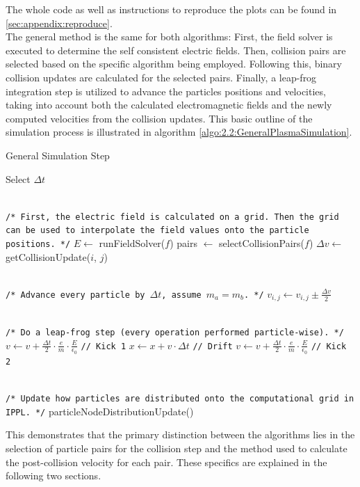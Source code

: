 The whole code as well as instructions to reproduce the plots can be found in \ref{sec:appendix:reproduce}. \\
The general method is the same for both algorithms: First, the field solver is executed to determine the self consistent electric fields. Then, collision pairs are selected based on the specific algorithm being employed. Following this, binary collision updates are calculated for the selected pairs. Finally, a leap-frog integration step is utilized to advance the particles positions and velocities, taking into account both the calculated electromagnetic fields and the newly computed velocities from the collision updates. This basic outline of the simulation process is illustrated in algorithm \ref{algo:2.2:GeneralPlasmaSimulation}. \\
\begin{algorithm}[H]
\caption{General Simulation Step}\label{algo:2.2:GeneralPlasmaSimulation}
\begin{algorithmic}[1]
    \STATE Select $\Delta t$
    
    \texttt{\\/* First, the electric field is calculated on a grid. Then the grid can be used to interpolate the field values onto the particle positions. */}
    \STATE $E \leftarrow$ runFieldSolver($f$)
    \STATE pairs $\leftarrow$ selectCollisionPairs($f$)
        \STATE $\Delta v \leftarrow$ getCollisionUpdate($i$, $j$) 
        
        \texttt{\\/* Advance every particle by $\Delta t$, assume $m_a=m_b$. */}
        \STATE $v_{i, j} \leftarrow v_{i, j} \pm \frac{\Delta v}{2}$ 
    \ENDFOR

    \texttt{\\/* Do a leap-frog step (every operation performed particle-wise). */}
    \STATE $v \leftarrow v + \frac{\Delta t}{2} \cdot \frac{e}{m} \cdot \frac{E}{\epsilon_0}$ \texttt{// Kick 1}
    \STATE $x \leftarrow x + v \cdot \Delta t$ \texttt{// Drift}
    \STATE $v \leftarrow v + \frac{\Delta t}{2} \cdot \frac{e}{m} \cdot \frac{E}{\epsilon_0}$ \texttt{// Kick 2}

    \texttt{\\/* Update how particles are distributed onto the computational grid in IPPL. */}
    \STATE particleNodeDistributionUpdate()
\end{algorithmic}
\end{algorithm}
This demonstrates that the primary distinction between the algorithms lies in the selection of particle pairs for the collision step and the method used to calculate the post-collision velocity for each pair. These specifics are explained in the following two sections.


